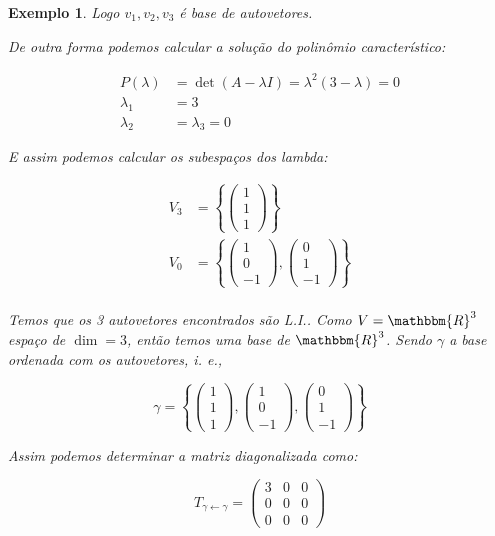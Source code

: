 \documentclass{article}
\newcommand{\REAL} {\mathbbm{R}}
\newcommand{\mudabase}[3] {#1_{#2 \leftarrow #3}}
\newcommand{\vetort}[3] {\begin{pmatrix}#1\\#2\\#3\end{pmatrix}} %
\newtheorem{example}{Exemplo}[section]
\begin{document}
\begin{example}
            Logo $v_1, v_2, v_3$ é base de autovetores.

            
            De outra forma podemos calcular a solução do polinômio característico:

            \begin{align*}
                P(\lambda) &= \det{(A - \lambda I)} = \lambda^2 (3 - \lambda) = 0\\
                \lambda_1 &= 3\\
                \lambda_2 &= \lambda_3 = 0
            \end{align*}

            E assim podemos calcular os subespaços dos lambda:

            \begin{align*}
                V_3 &= \left\{ \vetort{1}{1}{1} \right\}\\
                V_0 &= \left\{ \vetort{1}{0}{-1}, \vetort{0}{1}{-1} \right\}\\
            \end{align*}

            Temos que os 3 autovetores encontrados são L.I.. Como $V = \REAL^3$ espaço de 
            $\dim = 3$, então temos uma base de $\REAL^3$. Sendo $\gamma$ a base ordenada com os autovetores, i. e.,

            \[
                \gamma = \left\{ \vetort{1}{1}{1}, \vetort{1}{0}{-1}, \vetort{0}{1}{-1} \right\}
            \]

            Assim podemos determinar a matriz diagonalizada como:

            \[
                \mudabase{T}{\gamma}{\gamma} = \begin{pmatrix}3&0&0\\0&0&0\\0&0&0\end{pmatrix}
            \]
        \end{example}
\end{document}
